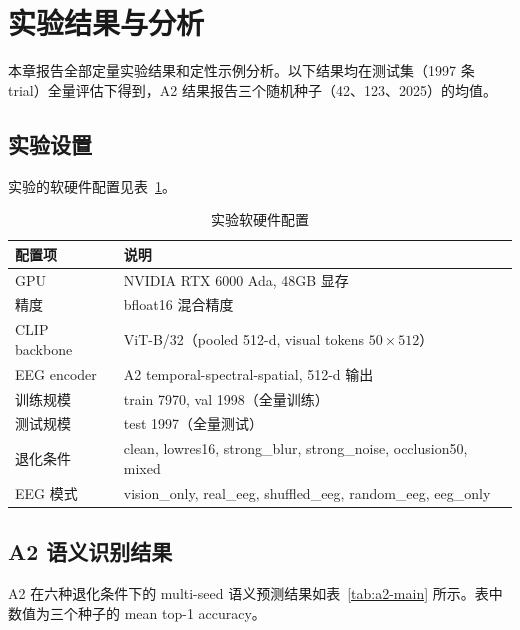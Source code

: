 \section{实验结果与分析}

本章报告全部定量实验结果和定性示例分析。以下结果均在测试集（1997 条 trial）全量评估下得到，A2 结果报告三个随机种子（42、123、2025）的均值。

\subsection{实验设置}

实验的软硬件配置见表~\ref{tab:exp-setup}。

\begin{table}[htbp]
  \centering
  \caption{实验软硬件配置}
  \label{tab:exp-setup}
  \begin{tabular}{l l}
    \toprule
    配置项 & 说明 \\
    \midrule
    GPU & NVIDIA RTX 6000 Ada, 48GB 显存 \\
    精度 & bfloat16 混合精度 \\
    CLIP backbone & ViT-B/32（pooled 512-d, visual tokens $50\times512$）\\
    EEG encoder & A2 temporal-spectral-spatial, 512-d 输出 \\
    训练规模 & train 7970, val 1998（全量训练）\\
    测试规模 & test 1997（全量测试）\\
    退化条件 & clean, lowres16, strong\_blur, strong\_noise, occlusion50, mixed \\
    EEG 模式 & vision\_only, real\_eeg, shuffled\_eeg, random\_eeg, eeg\_only \\
    \bottomrule
  \end{tabular}
\end{table}

\subsection{A2 语义识别结果}

A2 在六种退化条件下的 multi-seed 语义预测结果如表~\ref{tab:a2-main} 所示。表中数值为三个种子的 mean top-1 accuracy。

